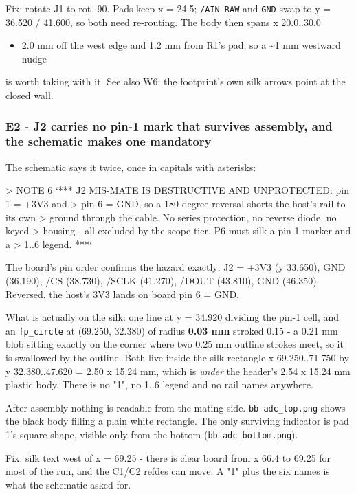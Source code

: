 \documentclass[11pt,a4paper]{article}
\begin{document}
Fix: rotate J1 to rot -90. Pads keep x = 24.5; \texttt{/AIN\_RAW} and \texttt{GND} swap to y = 36.520 / 41.600, so both need re-routing. The body then spans x 20.0..30.0

\begin{itemize}
\item 2.0 mm off the west edge and 1.2 mm from R1's pad, so a \textasciitilde{}1 mm westward nudge
\end{itemize}
is worth taking with it. See also W6: the footprint's own silk arrows point at the closed wall.

\subsubsection*{E2 - J2 carries no pin-1 mark that survives assembly, and the schematic makes one mandatory}
The schematic says it twice, once in capitals with asterisks:

\textgreater{} NOTE 6 `{*}{*}{*} J2 MIS-MATE IS DESTRUCTIVE AND UNPROTECTED: pin 1 = +3V3 and \textgreater{} pin 6 = GND, so a 180 degree reversal shorts the host's rail to its own \textgreater{} ground through the cable. No series protection, no reverse diode, no keyed \textgreater{} housing - all excluded by the scope tier. P6 must silk a pin-1 marker and a \textgreater{} 1..6 legend. {*}{*}{*}`

The board's pin order confirms the hazard exactly: J2 = +3V3 (y 33.650), GND (36.190), /CS (38.730), /SCLK (41.270), /DOUT (43.810), GND (46.350). Reversed, the host's 3V3 lands on board pin 6 = GND.

What is actually on the silk: one line at y = 34.920 dividing the pin-1 cell, and an \texttt{fp\_circle} at (69.250, 32.380) of radius \textbf{0.03 mm} stroked 0.15 - a 0.21 mm blob sitting exactly on the corner where two 0.25 mm outline strokes meet, so it is swallowed by the outline. Both live inside the silk rectangle x 69.250..71.750 by y 32.380..47.620 = 2.50 x 15.24 mm, which is \emph{under} the header's 2.54 x 15.24 mm plastic body. There is no "1", no 1..6 legend and no rail names anywhere.

After assembly nothing is readable from the mating side. \texttt{bb-adc\_top.png} shows the black body filling a plain white rectangle. The only surviving indicator is pad 1's square shape, visible only from the bottom (\texttt{bb-adc\_bottom.png}).

Fix: silk text west of x = 69.25 - there is clear board from x 66.4 to 69.25 for most of the run, and the C1/C2 refdes can move. A "1" plus the six names is what the schematic asked for.
\end{document}
